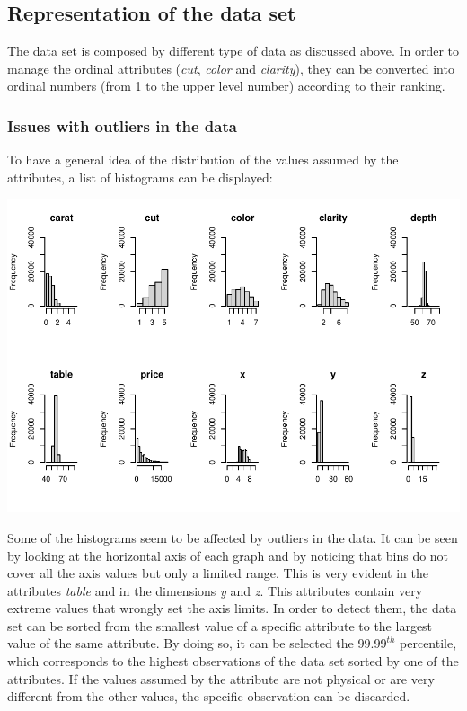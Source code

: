 \documentclass[
]{article}
\begin{document}
\subsection{Representation of the data
set}\label{representation-of-the-data-set}

The data set is composed by different type of data as discussed above.
In order to manage the ordinal attributes (\emph{cut}, \emph{color} and
\emph{clarity}), they can be converted into ordinal numbers (from 1 to
the upper level number) according to their ranking.

\subsubsection{Issues with outliers in the
data}\label{issues-with-outliers-in-the-data}

To have a general idea of the distribution of the values assumed by the
attributes, a list of histograms can be displayed:

\includegraphics{Report_files/figure-latex/unnamed-chunk-4-1.pdf}

\newpage

Some of the histograms seem to be affected by outliers in the data. It
can be seen by looking at the horizontal axis of each graph and by
noticing that bins do not cover all the axis values but only a limited
range. This is very evident in the attributes \emph{table} and in the
dimensions \emph{y} and \emph{z}. This attributes contain very extreme
values that wrongly set the axis limits. In order to detect them, the
data set can be sorted from the smallest value of a specific attribute
to the largest value of the same attribute. By doing so, it can be
selected the \(99.99^{th}\) percentile, which corresponds to the highest
observations of the data set sorted by one of the attributes. If the
values assumed by the attribute are not physical or are very different
from the other values, the specific observation can be discarded.
\end{document}
